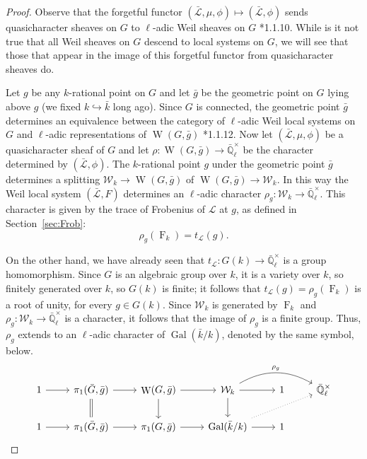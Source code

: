\documentclass[11pt]{amsart}
\theoremstyle{plain}
\theoremstyle{definition}
\theoremstyle{remark}
\newcommand{\EE}{\mathbb{\bar Q}_\ell}
\newcommand{\bFq}{\bar{k}}
\newcommand{\Fq}{k}
\newcommand{\EEx}{\EE^\times}
\DeclareMathOperator{\Gal}{Gal}
\DeclareMathOperator{\W}{W}
\newcommand{\Frob}[1]{{\operatorname{F}_{#1}}}
\newcommand{\cs}[1]{{\mathcal{#1}}}
\newcommand{\gcs}[1]{{\mathcal{\bar #1}}}
\newcommand{\Weil}[1]{\mathcal{W}_{#1}}
\newcommand{\trFrob}[1]{t_{#1}}
\newcommand{\bg}{\bar{g}}
\newcommand{\bG}{\bar{G}}
\begin{document}
\begin{proof}
  Observe that the forgetful functor $(\gcs{L},\mu,\phi) \mapsto (\gcs{L},\phi)$
  sends quasicharacter sheaves on $G$ to $\ell$-adic Weil sheaves on $G$ \cite{Deligne:Weil2}*{1.1.10}.
  While is it not true that all Weil sheaves on $G$ descend to local systems on $G$, 
  we will see that those that appear in the image of this forgetful functor from quasicharacter sheaves do. 

  Let $g$ be any $\Fq$-rational point on $G$ 
  and let $\bg$ be the geometric point on $G$ lying above $g$ 
  (we fixed $\Fq \hookrightarrow \bFq$ long ago). 
  Since $G$ is connected, the geometric point $\bg$ determines
  an equivalence between the category of $\ell$-adic Weil local systems on $G$ and
  $\ell$-adic representations of $\W(G,\bg)$ \cite{Deligne:Weil2}*{1.1.12}. 
  Now let $(\gcs{L},\mu,\phi)$ be a quasicharacter sheaf of $G$ 
  and let $\rho : \W(G, \bg) \to \EEx$ be the character determined by $(\gcs{L},\phi)$. 
  The $\Fq$-rational point $g$ under the geometric point $\bg$ determines a splitting
  $\Weil{\Fq}\to \W(G,\bg)$ of $\W(G,\bg)\to \Weil{\Fq}$. 
  In this way the Weil local system $(\gcs{L},F)$ determines an $\ell$-adic character $\rho_g : \Weil{\Fq} \to \EEx$.
  This character is given by the trace of Frobenius of $\cs{L}$ at $g$, as defined in Section~\ref{sec:Frob}:
  \[
  \rho_g(\Frob{\Fq}) =  \trFrob{\cs{L}}(g).
  \]
  
  On the other hand, we have already seen that $\trFrob{\cs{L}} : G(\Fq) \to \EEx$
  is a group homomorphism. Since $G$ is an algebraic group over $\Fq$, it is a
  variety over $\Fq$, so finitely generated over $\Fq$, so $G(\Fq)$ is finite;
  it follows that $\trFrob{\cs{L}}(g) = \rho_g(\Frob{\Fq})$ is a root of unity,
  for every $g\in G(\Fq)$.  Since $\Weil{\Fq}$ is generated by
  $\Frob{\Fq}$ and $\rho_g : \Weil{\Fq} \to \EEx$ is
  a character, it follows that the image of $\rho_g$ is a finite group.
  Thus, $\rho_g$ extends to an $\ell$-adic character of $\Gal(\bFq/\Fq)$, 
  denoted by the same symbol, below.
  \[
  \begin{tikzcd}
  1 \rar & \ar[equal]{d} \pi_1(\bG, \bg) \rar & \W(G,\bg) \rar \dar & \Weil{\Fq} \arrow[bend left]{rr}{\rho_g} \rar \dar & 1 & \EEx\\
  1 \rar &  \pi_1(\bG, \bg) \rar & \pi_1(G,\bg) \rar & \Gal(\bFq/\Fq) \arrow[dotted]{rru} \rar & 1 &
  \end{tikzcd}
  \]


\end{proof}
\end{document}
